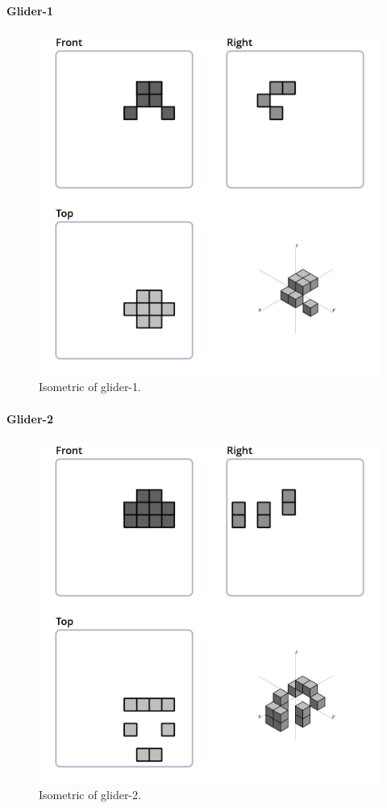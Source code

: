 \paragraph{Glider-1}
\begin{figure}
	\centering
	\includegraphics[scale=0.3]{iso_settings/glider_1.png}
	\caption{Isometric of glider-1.}
  \label{fig:iso-glider-1}
\end{figure}

\paragraph{Glider-2}
\begin{figure}
	\centering
	\includegraphics[scale=0.3]{iso_settings/glider_2.png}
	\caption{Isometric of glider-2.}
  \label{fig:iso-glider-2}
\end{figure}

